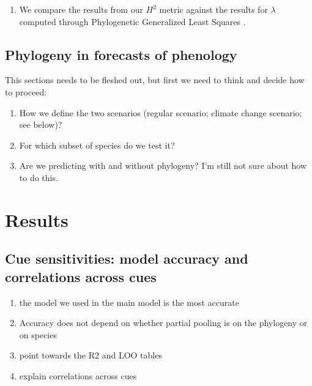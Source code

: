 \documentclass{article}\usepackage[]{graphicx}\usepackage[]{color}
\begin{document}
\begin{enumerate}
\item We compare the results from our $H^{2}$ metric against the results for $\lambda$ computed through Phylogenetic Generalized Least Squares \citep{freckleton2002phylogenetic}. 

\end{enumerate}

\subsection*{Phylogeny in forecasts of phenology}
This sections needs to be fleshed out, but first we need to think and decide how to proceed:

\begin{enumerate}

\item How we define the two scenarios (regular scenario; climate change scenario; see below)?
\item For which subset of species do we test it?
\item Are we predicting with and without phylogeny? I'm still not sure about how to do this.

\end{enumerate}




\section*{Results}

\subsection*{Cue sensitivities: model accuracy and correlations across cues}
\begin{enumerate}
\item the model we used in the main model is the most accurate 
\item Accuracy does not depend on whether partial pooling is on the phylogeny or on species
\item point towards the R2 and LOO tables
\item explain correlations across cues
\end{enumerate}
\end{document}

